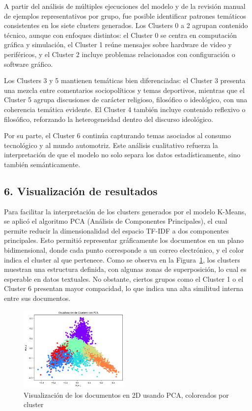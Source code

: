 \documentclass[journal]{IEEEtran}
\begin{document}
\vspace{1em}

A partir del análisis de múltiples ejecuciones del modelo y de la revisión manual de ejemplos representativos por grupo, fue posible identificar patrones temáticos consistentes en los siete clusters generados. Los Clusters 0 a 2 agrupan contenido técnico, aunque con enfoques distintos: el Cluster 0 se centra en computación gráfica y simulación, el Cluster 1 reúne mensajes sobre hardware de video y periféricos, y el Cluster 2 incluye problemas relacionados con configuración o software gráfico.

\vspace{12pt}
Los Clusters 3 y 5 mantienen temáticas bien diferenciadas: el Cluster 3 presenta una mezcla entre comentarios sociopolíticos y temas deportivos, mientras que el Cluster 5 agrupa discusiones de carácter religioso, filosófico o ideológico, con una coherencia temática evidente. El Cluster 4 también incluye contenido reflexivo o filosófico, reforzando la heterogeneidad dentro del discurso ideológico.

\vspace{12pt}
Por su parte, el Cluster 6 continúa capturando temas asociados al consumo tecnológico y al mundo automotriz. Este análisis cualitativo refuerza la interpretación de que el modelo no solo separa los datos estadísticamente, sino también semánticamente.

\subsection*{6. Visualización de resultados}

Para facilitar la interpretación de los clusters generados por el modelo K-Means, se aplicó el algoritmo PCA (Análisis de Componentes Principales), el cual permite reducir la dimensionalidad del espacio TF-IDF a dos componentes principales. Esto permitió representar gráficamente los documentos en un plano bidimensional, donde cada punto corresponde a un correo electrónico, y el color indica el cluster al que pertenece. Como se observa en la Figura~\ref{fig:pca}, los clusters muestran una estructura definida, con algunas zonas de superposición, lo cual es esperable en datos textuales. No obstante, ciertos grupos como el Cluster 1 o el Cluster 6 presentan mayor compacidad, lo que indica una alta similitud interna entre sus documentos.

\begin{figure}[H]
    \centering
    \includegraphics[width=0.48\textwidth]{fig4.png}
    \caption{Visualización de los documentos en 2D usando PCA, coloreados por cluster}
    \label{fig:pca}
\end{figure}
\end{document}
